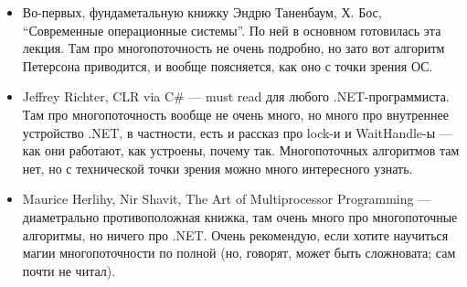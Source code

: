 \documentclass{../../text-style}
\begin{document}
\begin{itemize}
    \item Во-первых, фундаметальную книжку Эндрю Таненбаум, Х. Бос, \enquote{Современные операционные системы}. По ней в основном готовилась эта лекция. Там про многопоточность не очень подробно, но зато вот алгоритм Петерсона приводится, и вообще поясняется, как оно с точки зрения ОС.
    \item Jeffrey Richter, CLR via C\# --- must read для любого .NET-программиста. Там про многопоточность вообще не очень много, но много про внутреннее устройство .NET, в частности, есть и рассказ про lock-и и WaitHandle-ы --- как они работают, как устроены, почему так. Многопоточных алгоритмов там нет, но с технической точки зрения можно много интересного узнать.
    \item Maurice Herlihy, Nir Shavit, The Art of Multiprocessor Programming --- диаметрально противоположная книжка, там очень много про многопоточные алгоритмы, но ничего про .NET. Очень рекомендую, если хотите научиться магии многопоточности по полной (но, говорят, может быть сложновата; сам почти не читал).
\end{itemize}
\end{document}
